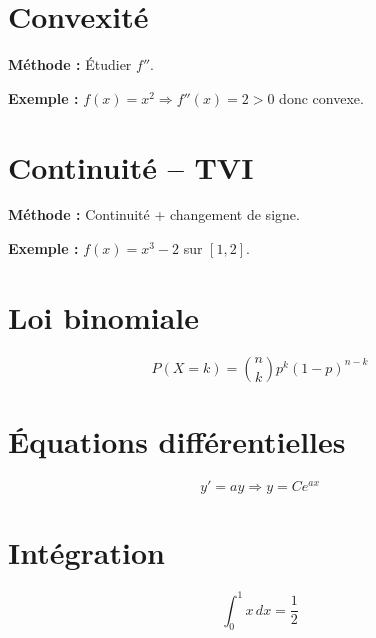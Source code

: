 \documentclass[11pt]{article}
\begin{document}
\section{Convexité}
\textbf{Méthode :} Étudier $f''$.

\textbf{Exemple :} $f(x)=x^2 \Rightarrow f''(x)=2>0$ donc convexe.

\section{Continuité – TVI}
\textbf{Méthode :} Continuité + changement de signe.

\textbf{Exemple :} $f(x)=x^3-2$ sur $[1,2]$.

\section{Loi binomiale}
\[
P(X=k)=\binom{n}{k}p^k(1-p)^{n-k}
\]

\section{Équations différentielles}
\[
y'=ay \Rightarrow y=Ce^{ax}
\]

\section{Intégration}
\[
\int_0^1 x\,dx = \frac{1}{2}
\]
\end{document}
